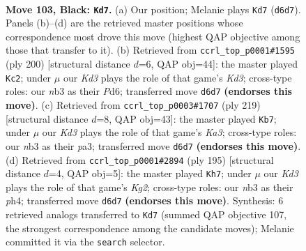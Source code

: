 \documentclass[11pt]{article}
\begin{document}
\clearpage

\begin{figure}[p]\centering
\begin{subfigure}{0.46\textwidth}\centering
\resizebox{\linewidth}{!}{%
\newchessgame
\chessboard[
  setfen={8/8/3k2K1/8/8/1N6/2R3Pr/8 b - - 71 103},
  showmover=false,
  pgfstyle=straightmove, color=movearrow, markmove={d6-d7}
]}
\caption{}
\end{subfigure}\hfill
\begin{subfigure}{0.46\textwidth}\centering
\resizebox{\linewidth}{!}{%
\newchessgame
\chessboard[
  setfen={8/8/r2P4/8/5k2/3K4/p7/R7 w - - 7 101},
  showmover=false,
  pgfstyle=straightmove, color=movearrow, markmove={d3-c2}
]}
\caption{}
\end{subfigure}
\\[4pt]
\begin{subfigure}{0.46\textwidth}\centering
\resizebox{\linewidth}{!}{%
\newchessgame
\chessboard[
  setfen={7R/8/k7/8/7P/P6r/1K6/8 b - - 4 110},
  showmover=false,
  pgfstyle=straightmove, color=movearrow, markmove={a6-b7}
]}
\caption{}
\end{subfigure}\hfill
\begin{subfigure}{0.46\textwidth}\centering
\resizebox{\linewidth}{!}{%
\newchessgame
\chessboard[
  setfen={1R6/1P4k1/8/2K5/7P/8/1r6/8 b - - 8 98},
  showmover=false,
  pgfstyle=straightmove, color=movearrow, markmove={g7-h7}
]}
\caption{}
\end{subfigure}
\caption{\textbf{Move 103, Black: \texttt{Kd7}.} (a) Our position; Melanie plays \texttt{Kd7} (\texttt{d6d7}). Panels (b)--(d) are the retrieved master positions whose correspondence most drove this move (highest QAP objective among those that transfer to it). (b) Retrieved from \texttt{ccrl\_top\_p0001\#1595} (ply 200) [structural distance $d$=6, QAP obj=44]: the master played \texttt{Kc2}; under $\mu$ our \emph{Kd3} plays the role of that game's \emph{Kd3}; cross-type roles: our \emph{n}b3 as their \emph{P}d6; transferred move \texttt{d6d7} \textbf{(endorses this move)}. (c) Retrieved from \texttt{ccrl\_top\_p0003\#1707} (ply 219) [structural distance $d$=8, QAP obj=43]: the master played \texttt{Kb7}; under $\mu$ our \emph{Kd3} plays the role of that game's \emph{Ka3}; cross-type roles: our \emph{n}b3 as their \emph{p}a3; transferred move \texttt{d6d7} \textbf{(endorses this move)}. (d) Retrieved from \texttt{ccrl\_top\_p0001\#2894} (ply 195) [structural distance $d$=4, QAP obj=5]: the master played \texttt{Kh7}; under $\mu$ our \emph{Kd3} plays the role of that game's \emph{Kg2}; cross-type roles: our \emph{n}b3 as their \emph{p}h4; transferred move \texttt{d6d7} \textbf{(endorses this move)}. Synthesis: 6 retrieved analogs transferred to \texttt{Kd7} (summed QAP objective 107, the strongest correspondence among the candidate moves); Melanie committed it via the \texttt{search} selector.}
\label{fig:thought-m205}
\end{figure}
\end{document}
